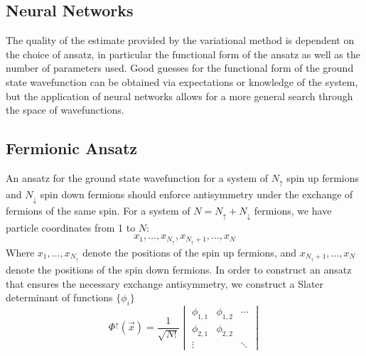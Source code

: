 \documentclass
[amsmath,10pt,aps,preprintnumbers,onecolumn,groupedaddress,superscriptaddress,notitlepage,nofootinbib,prd]{revtex4-1}
\begin{document}
\subsection{Neural Networks}
The quality of the estimate provided by the variational method is dependent on the choice of ansatz, in particular the functional form of the ansatz as well as the number of
parameters used. Good guesses for the functional form of the ground state wavefunction can be obtained via expectations or knowledge of the system, but the
application of neural networks allows for a more general search through the space of wavefunctions.

\subsection{Fermionic Ansatz}
An ansatz for the ground state wavefunction for a system of $N_\uparrow$ spin up fermions and $N_\downarrow$ spin down fermions should enforce antisymmetry under the exchange of fermions of the same spin. For a system of $N = N_\uparrow + N_\downarrow$ fermions, we have particle coordinates from 1 to $N$:
\begin{equation}
    x_1,\dots, x_{N_\uparrow}, x_{N_\uparrow + 1},\dots, x_{N}
\end{equation}
Where $x_1,\dots,x_{N_\uparrow}$ denote the positions of the spin up fermions, and $x_{N_\uparrow + 1},\dots, x_{N}$ denote the positions of the spin down fermions. In order to construct an ansatz that ensures the necessary exchange antisymmetry, we construct a Slater
determinant of functions $\{\phi_i\}$
\begin{equation}
	\Phi^\uparrow \left(\vec{x}\right) = \frac{1}{\sqrt{N!}} \begin{vmatrix}
		\phi_{1,1} & \phi_{1,2} & \cdots \\ 
		\phi_{2,1} & \phi_{2,2}   \\ 
		\vdots & & \ddots
	\end{vmatrix}
\end{equation}
\end{document}
